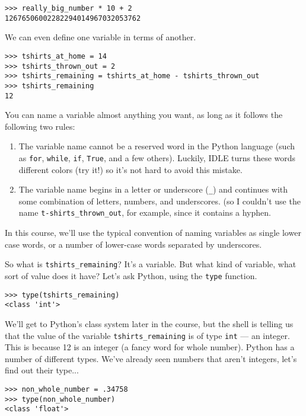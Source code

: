 \begin{lstlisting}[numbers=none]
>>> really_big_number * 10 + 2
12676506002282294014967032053762
\end{lstlisting}

We can even define one variable in terms of another.

\begin{lstlisting}[numbers=none]
>>> tshirts_at_home = 14
>>> tshirts_thrown_out = 2
>>> tshirts_remaining = tshirts_at_home - tshirts_thrown_out
>>> tshirts_remaining
12
\end{lstlisting}

You can name a variable almost anything you want, as long as it follows the following two rules:
\begin{enumerate}
\item The variable name cannot be a reserved word in the Python language (such as \texttt{for}, \texttt{while}, \texttt{if}, \texttt{True}, and a few others). Luckily, IDLE turns these words different colors (try it!) so it’s not hard to avoid this mistake.

\item The variable name begins in a letter or underscore (\texttt{\_}) and continues with some combination of letters, numbers, and underscores. (so I couldn’t use the name \texttt{t-shirts\_thrown\_out}, for example, since it contains a hyphen.
\end{enumerate}

In this course, we’ll use the typical convention of naming variables as single lower case words, or a number of lower-case words separated by underscores.

So what is \texttt{tshirts\_remaining}? It’s a variable. But what kind of variable, what sort of value does it have? Let’s ask Python, using the \texttt{type} function.

\begin{lstlisting}[numbers=none]
>>> type(tshirts_remaining)
<class 'int'>
\end{lstlisting}

We’ll get to Python’s class system later in the course, but the shell is telling us that the value of the variable \texttt{tshirts\_remaining} is of type \texttt{\textquotesingle int\textquotesingle} --- an integer. This is because 12 is an integer (a fancy word for whole number). Python has a number of different types. We’ve already seen numbers that aren’t integers, let’s find out their type...

\begin{lstlisting}[numbers=none]
>>> non_whole_number = .34758
>>> type(non_whole_number)
<class 'float'>
\end{lstlisting}


